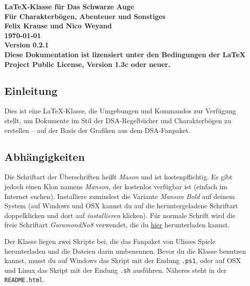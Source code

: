 \documentclass{dsa}
\begin{document}
  \begin{dsaTitlePage}
    \bfseries \Huge \LaTeX-Klasse für Das Schwarze Auge \\[15pt]
    \LARGE Für Charakterbögen, Abenteuer und Sonstiges \\[40pt]
    {\large \normalfont Felix Krause und Nico Weyand\\[10pt] \today \\[10pt] Version 0.2.1} \\[15pt]
    {\small \normalfont Diese Dokumentation ist lizensiert unter den Bedingungen der
     LaTeX Project Public License, Version 1.3c oder neuer.}
  \end{dsaTitlePage}


  \subsection*{Einleitung}

  Dies ist eine \LaTeX-Klasse, die Umgebungen und Kommandos zur Verfügung
  stellt, um Dokumente im Stil der DSA-Regelbücher und Charakterbögen zu 
  erstellen – auf der Basis der Grafiken aus dem DSA-Fanpaket.

  \subsection*{Abhängigkeiten}

  Die Schriftart der Überschriften heißt \textit{Mason} und ist
  kostenpflichtig. Es gibt jedoch einen Klon namens \textit{Manson}, der
  kostenlos verfügbar ist (einfach im Internet suchen). Installiere zumindest
  die Variante \textit{Manson Bold} auf deinem System (auf Windows und OSX
  kannst du auf die heruntergeladene Schriftart doppelklicken und dort auf
  \textit{installieren} klicken). Für normale Schrift wird die freie Schriftart
  \textit{GaramondNo8} verwendet, die du \href{http://garamond.org}{hier}
  herunterladen kannst.
  
  Der Klasse liegen zwei Skripte bei, die das Fanpaket von Ulisses Spiele
  herunterladen und die Dateien darin umbenennen. Bevor du die Klasse benutzen
  kannst, musst du auf Windows das Skript mit der Endung \texttt{.ps1}, oder
  auf OSX und Linux das Skript mit der Endung \texttt{.sh} ausführen. Näheres
  steht in der \texttt{README.html}.
  
\end{document}

